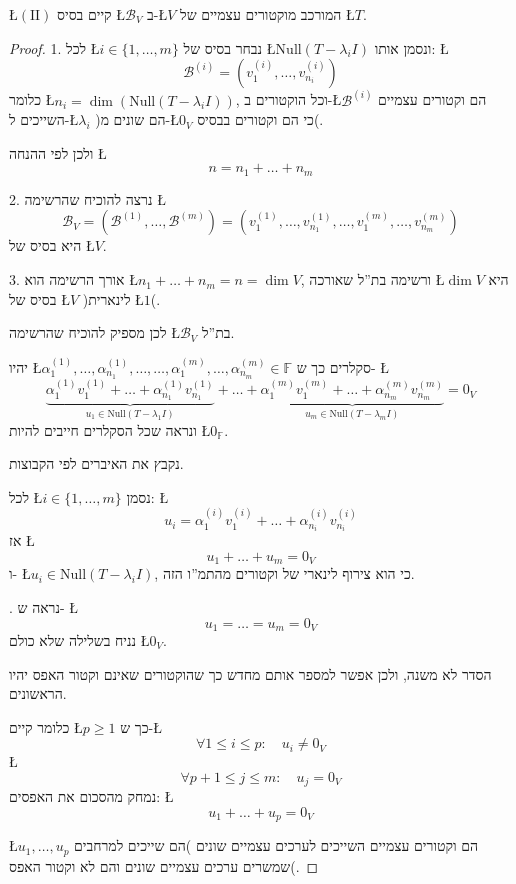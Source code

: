 \documentclass[english,hebrew]{article}
\begin{document}
\L{$(\text{II})$} קיים בסיס \L{$\mathcal{B}_{V}$} ב-\L{$V$} המורכב
מוקטורים עצמיים של \L{$T$}.
\begin{proof}
1. לכל \L{$i\in\{1,\dots,m\}$} נבחר בסיס של \L{$\text{Null}(T-\lambda_{i}I)$}
ונסמן אותו: \L{%
\[
\mathcal{B}^{(i)}=(v_{1}^{(i)},\dots,v_{n_{i}}^{(i)})
\]
}%
כלומר \L{$n_{i}=\dim\left(\text{Null}(T-\lambda_{i}I)\right)$}, וכל
הוקטורים ב-\L{$\mathcal{B}^{(i)}$} הם וקטורים עצמיים השייכים ל-\L{$\lambda_{i}$}
)הם שונים מ-\L{$0_{V}$} כי הם וקטורים בבסיס(.

ולכן לפי ההנחה \L{%
\[
n=n_{1}+\dots+n_{m}
\]
}%

2. נרצה להוכיח שהרשימה \L{%
\[
\mathcal{B}_{V}=(\mathcal{B}^{(1)},\dots,\mathcal{B}^{(m)})=(v_{1}^{(1)},\dots,v_{n_{1}}^{(1)},\dots,v_{1}^{(m)},\dots,v_{n_{m}}^{(m)})
\]
}%
היא בסיס של \L{$V$}.

3. אורך הרשימה הוא \L{$n_{1}+\dots+n_{m}=n=\dim V$}, ורשימה בת\textquotedblright ל
שאורכה \L{$\dim V$} היא בסיס של \L{$V$} )לינארית \L{$1$}(. 

לכן מספיק להוכיח שהרשימה \L{$\mathcal{B}_{V}$} בת\textquotedblright ל.

יהיו \L{$\alpha_{1}^{(1)},\dots,\alpha_{n_{1}}^{(1)},\dots,\dots,\alpha_{1}^{(m)},\dots,\alpha_{n_{m}}^{(m)}\in\mathbb{F}$}
סקלרים כך ש- \L{%
\[
\underset{u_{1}\in\text{Null}(T-\lambda_{1}I)}{\underbrace{\alpha_{1}^{(1)}v_{1}^{(1)}+\dots+\alpha_{n_{1}}^{(1)}v_{n_{1}}^{(1)}}}+\dots+\underset{u_{m}\in\text{Null}(T-\lambda_{m}I)}{\underbrace{\alpha_{1}^{(m)}v_{1}^{(m)}+\dots+\alpha_{n_{m}}^{(m)}v_{n_{m}}^{(m)}}}=0_{V}
\]
}%
ונראה שכל הסקלרים חייבים להיות \L{$0_{\mathbb{F}}$}.

נקבץ את האיברים לפי הקבוצות. 

לכל \L{$i\in\{1,\dots,m\}$} נסמן: \L{%
\[
u_{i}=\alpha_{1}^{(i)}v_{1}^{(i)}+\dots+\alpha_{n_{i}}^{(i)}v_{n_{i}}^{(i)}
\]
}%
אז \L{%
\[
u_{1}+\dots+u_{m}=0_{V}
\]
}%
ו- \L{$u_{i}\in\text{Null}(T-\lambda_{i}I)$}, כי הוא צירוף לינארי
של וקטורים מהתמ\textquotedblright ו הזה.

{\endL}. נראה ש- \L{%
\[
u_{1}=\dots=u_{m}=0_{V}
\]
}%
נניח בשלילה שלא כולם \L{$0_{V}$}.

הסדר לא משנה, ולכן אפשר למספר אותם מחדש כך שהוקטורים שאינם וקטור האפס
יהיו הראשונים.

כלומר קיים \L{$p\geq1$} כך ש-\L{%
\[
\forall1\le i\le p:\quad u_{i}\ne0_{V}
\]
}%
\L{%
\[
\forall p+1\le j\le m:\quad u_{j}=0_{V}
\]
}%
נמחק מהסכום את האפסים: \L{%
\[
u_{1}+\dots+u_{p}=0_{V}
\]
}%

\L{$u_{1},\dots,u_{p}$} הם וקטורים עצמיים השייכים לערכים עצמיים שונים
)הם שייכים למרחבים שמשרים ערכים עצמיים שונים והם לא וקטור האפס(.


\end{proof}
\end{document}
